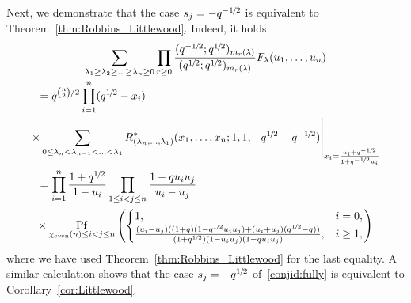 \documentclass[ALCO, Unicode]{cedram}
\newcommand{\half}{1\mkern-2mu/\mkern-2mu2}
\DeclareMathOperator*{\pf}{Pf}
\begin{document}
	Next, we demonstrate that the case 
	$s_j=-q^{-\half}$ is equivalent to Theorem~\ref{thm:Robbins_Littlewood}. Indeed, it holds
	\begin{multline*} 
		\sum_{\lambda_1 \ge \lambda_2 \ge \ldots \ge \lambda_n \ge 0} 
		\prod_{r \ge 0} \frac{(q^{-\half};q^{\half})_{m_r(\lambda)}}{(q^{\half};q^{\half})_{m_r(\lambda)}} F_{\lambda}(u_1,\ldots,u_n) \\ 
		\shoveleft{ =   q^{\binom{n}{2}/2} \prod_{i=1}^n (q^{\half}-x_i)}\\
		\left.\times\sum_{0 \le \lambda_n < \lambda_{n-1} < \ldots < \lambda_1} 
		R^{\ast}_{(\lambda_n,\ldots,\lambda_1)}(x_1,\ldots,x_n;1,1,-q^{\half}-q^{-\half})
		\right|_{x_i = \frac{u_i+q^{-\half}}{1+q^{-\half} u_i}}\\
		\shoveleft{ = \prod_{i=1}^n \frac{1+q^{\half}}{1-u_i} \prod_{1 \le i < j \le n} \frac{1-q u_i u_j}{u_i-u_j}}\\
		\times \pf_{\chi_{\mathrm{even}}(n) \le i < j \le n} \left(
		\begin{cases}
			1, & i=0,\\
			\frac{(u_i-u_j)((1+q)(1- q^{\half} u_i u_j) + (u_i + u_j)(q^{\half}- q))}{(1+q^{\half})(1- u_i u_j)(1- q u_i u_j)},& i\ge 1,
		\end{cases} \right)
	\end{multline*} 
	where we have used Theorem~\ref{thm:Robbins_Littlewood} for the last equality.
	A similar calculation shows that the case $s_j=-q^{\half}$ of~\eqref{conjid:fully} is equivalent to Corollary~\ref{cor:Littlewood}.
	
\end{document}
